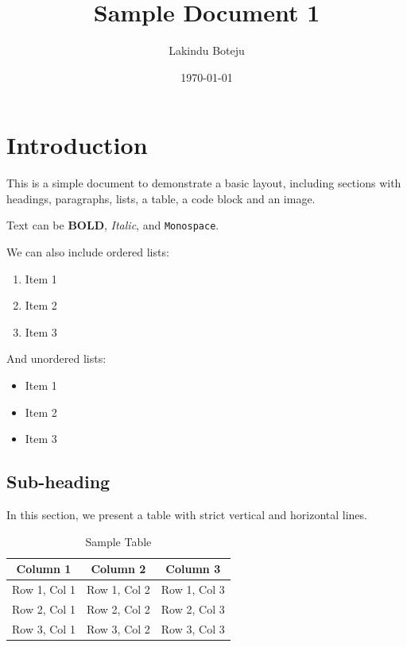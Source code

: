 \documentclass{article}
\begin{document}
\title{Sample Document 1}
\author{Lakindu Boteju}
\date{\today}

\maketitle

\section{Introduction}

This is a simple document to demonstrate a basic layout, including sections with headings, paragraphs, lists, a table, a code block and an image.

\vfill
\noindent
Text can be \textbf{BOLD}, \textit{Italic}, and \texttt{Monospace}.

\vfill
\noindent
We can also include ordered lists:
\begin{enumerate}
    \item Item 1
    \item Item 2
    \item Item 3
\end{enumerate}

\vfill
\noindent
And unordered lists:
\begin{itemize}
    \item Item 1
    \item Item 2
    \item Item 3
\end{itemize}

\subsection{Sub-heading}

In this section, we present a table with strict vertical and horizontal lines.

\begin{table}[H]
    \centering
    \begin{tabular}{|c|c|c|}
        \hline
        \textbf{Column 1} & \textbf{Column 2} & \textbf{Column 3} \\
        \hline
        Row 1, Col 1 & Row 1, Col 2 & Row 1, Col 3 \\
        \hline
        Row 2, Col 1 & Row 2, Col 2 & Row 2, Col 3 \\
        \hline
        Row 3, Col 1 & Row 3, Col 2 & Row 3, Col 3 \\
        \hline
    \end{tabular}
    \caption{Sample Table}
    \label{tab:sample_table}
\end{table}
\end{document}
